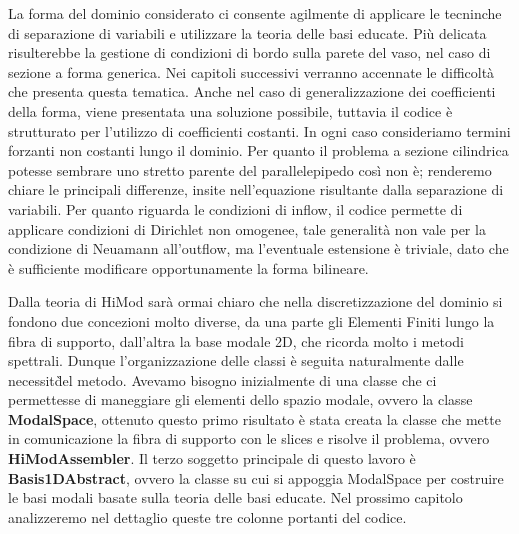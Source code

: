 La forma del dominio considerato ci consente agilmente di applicare le tecninche di separazione di variabili e utilizzare la teoria delle basi educate. Pi\`u delicata risulterebbe la gestione di condizioni di bordo sulla parete del vaso, nel caso di sezione a forma generica. Nei capitoli successivi verranno accennate le difficolt\`a che presenta questa tematica.
Anche nel caso di generalizzazione dei coefficienti della forma, viene presentata una soluzione possibile, tuttavia il codice \`e strutturato per l'utilizzo di coefficienti costanti. In ogni caso consideriamo termini forzanti non costanti lungo il dominio.
Per quanto il problema a sezione cilindrica potesse sembrare uno stretto parente del parallelepipedo cos\`i non \`e; renderemo chiare le principali differenze, insite nell'equazione risultante dalla separazione di variabili.
Per quanto riguarda le condizioni di inflow, il codice permette di applicare condizioni di Dirichlet non omogenee, tale generalit\`a non vale per la condizione di Neuamann all'outflow, ma l'eventuale estensione \`e triviale, dato che \`e sufficiente modificare opportunamente la forma bilineare.

Dalla teoria di HiMod sar\`a ormai chiaro che nella discretizzazione del dominio si fondono due concezioni molto diverse, da una parte gli Elementi Finiti lungo la fibra di supporto, dall'altra la base modale 2D, che ricorda molto i metodi spettrali. 
Dunque l'organizzazione delle classi \`e seguita naturalmente dalle necessit\`del metodo. Avevamo bisogno inizialmente di una classe che ci permettesse di maneggiare gli elementi dello spazio modale, ovvero la classe \textbf{ModalSpace}, ottenuto questo primo risultato \`e stata creata la classe che mette in comunicazione la fibra di supporto con le slices e risolve il problema, ovvero \textbf{HiModAssembler}. Il terzo soggetto principale di questo lavoro \`e \textbf{Basis1DAbstract}, ovvero la classe su cui si appoggia ModalSpace per costruire le basi modali basate sulla teoria delle basi educate.
Nel prossimo capitolo analizzeremo nel dettaglio queste tre colonne portanti del codice.
